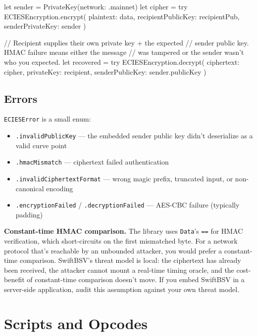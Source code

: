 \documentclass[a4paper, 11pt, openany]{book}
\begin{document}
\begin{forthbox}
let sender = PrivateKey(network: .mainnet)
let cipher = try ECIESEncryption.encrypt(
    plaintext: data,
    recipientPublicKey: recipientPub,
    senderPrivateKey: sender
)

// Recipient supplies their own private key + the expected
// sender public key. HMAC failure means either the message
// was tampered or the sender wasn't who you expected.
let recovered = try ECIESEncryption.decrypt(
    ciphertext: cipher,
    privateKey: recipient,
    senderPublicKey: sender.publicKey
)
\end{forthbox}

\section{Errors}

\texttt{ECIESError} is a small enum:

\begin{itemize}
\item \texttt{.invalidPublicKey} --- the embedded sender public key didn't deserialize as a valid curve point
\item \texttt{.hmacMismatch} --- ciphertext failed authentication
\item \texttt{.invalidCiphertextFormat} --- wrong magic prefix, truncated input, or non-canonical encoding
\item \texttt{.encryptionFailed} / \texttt{.decryptionFailed} --- AES-CBC failure (typically padding)
\end{itemize}

\begin{notebox}
\textbf{Constant-time HMAC comparison.} The library uses \texttt{Data}'s \texttt{==} for HMAC verification, which short-circuits on the first mismatched byte. For a network protocol that's reachable by an unbounded attacker, you would prefer a constant-time comparison. SwiftBSV's threat model is local: the ciphertext has already been received, the attacker cannot mount a real-time timing oracle, and the cost-benefit of constant-time comparison doesn't move. If you embed SwiftBSV in a server-side application, audit this assumption against your own threat model.
\end{notebox}

\chapter{Scripts and Opcodes}
\end{document}
